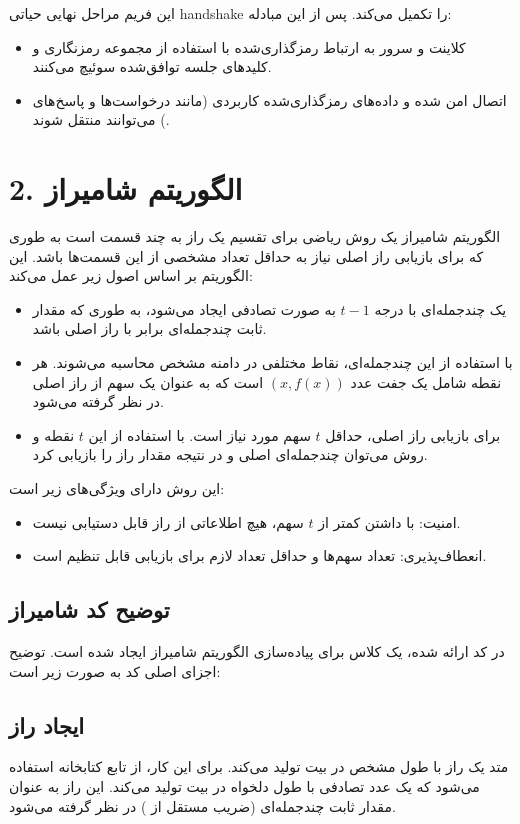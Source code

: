 این فریم مراحل نهایی حیاتی handshake  را تکمیل می‌کند. پس از این مبادله:
\begin{itemize}
    \item کلاینت و سرور به ارتباط رمزگذاری‌شده با استفاده از مجموعه رمزنگاری و کلیدهای جلسه توافق‌شده سوئیچ می‌کنند.
    \item اتصال امن شده و داده‌های رمزگذاری‌شده کاربردی (مانند درخواست‌ها و پاسخ‌های ) می‌توانند منتقل شوند.
\end{itemize}
\section*{2. الگوریتم شامیراز}

الگوریتم شامیراز  یک روش ریاضی برای تقسیم یک راز به چند قسمت است به طوری که برای بازیابی راز اصلی نیاز به حداقل تعداد مشخصی از این قسمت‌ها باشد. این الگوریتم بر اساس اصول زیر عمل می‌کند:

\begin{itemize}
    \item یک چندجمله‌ای با درجه $t-1$ به صورت تصادفی ایجاد می‌شود، به طوری که مقدار ثابت چندجمله‌ای برابر با راز اصلی باشد.
    \item با استفاده از این چندجمله‌ای، نقاط مختلفی در دامنه مشخص محاسبه می‌شوند. هر نقطه شامل یک جفت عدد $(x, f(x))$ است که به عنوان یک سهم از راز اصلی در نظر گرفته می‌شود.
    \item برای بازیابی راز اصلی، حداقل $t$ سهم مورد نیاز است. با استفاده از این $t$ نقطه و روش  می‌توان چندجمله‌ای اصلی و در نتیجه مقدار راز را بازیابی کرد.
\end{itemize}

این روش دارای ویژگی‌های زیر است:
\begin{itemize}
    \item امنیت: با داشتن کمتر از $t$ سهم، هیچ اطلاعاتی از راز قابل دستیابی نیست.
    \item انعطاف‌پذیری: تعداد سهم‌ها و حداقل تعداد لازم برای بازیابی قابل تنظیم است.
\end{itemize}

\subsection*{توضیح کد شامیراز}

در کد ارائه شده، یک کلاس  برای پیاده‌سازی الگوریتم شامیراز ایجاد شده است. توضیح اجزای اصلی کد به صورت زیر است:

\subsection*{ایجاد راز}
متد  یک راز با طول مشخص در بیت تولید می‌کند. برای این کار، از تابع  کتابخانه  استفاده می‌شود که یک عدد تصادفی با طول دلخواه در بیت تولید می‌کند. این راز به عنوان مقدار ثابت چندجمله‌ای (ضریب مستقل از ) در نظر گرفته می‌شود.

